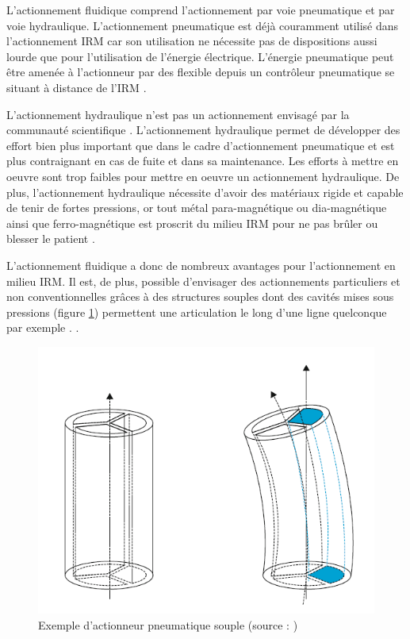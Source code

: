 \documentclass[10pt, a4paper]{article}
\begin{document}
            \qquad L'actionnement fluidique comprend l'actionnement par voie pneumatique et par voie hydraulique. L'actionnement pneumatique est déjà couramment utilisé dans l'actionnement IRM car son utilisation ne nécessite pas de dispositions aussi lourde que pour l'utilisation de l'énergie électrique. L'énergie pneumatique peut être amenée à l'actionneur par des flexible depuis un contrôleur pneumatique se situant à distance de l'IRM \cite{Fischer2008a}\cite{Pfeil2018}. 
            
             L'actionnement hydraulique n'est pas un actionnement envisagé par la communauté scientifique \cite{Fischer2008}. L'actionnement hydraulique permet de développer des effort bien plus important que dans le cadre d'actionnement pneumatique et est plus contraignant en cas de fuite et dans sa maintenance. Les efforts à mettre en oeuvre sont trop faibles \cite{Pfeil2018}\cite{Fischer2008a} pour mettre en oeuvre un actionnement hydraulique. De plus, l'actionnement hydraulique nécessite d'avoir des matériaux rigide et capable de tenir de fortes pressions, or tout métal para-magnétique ou dia-magnétique ainsi que ferro-magnétique est proscrit du milieu IRM pour ne pas brûler ou blesser le patient \cite{Sammet2016}.
             
 
             L'actionnement fluidique a donc de nombreux avantages pour l'actionnement en milieu IRM. Il est, de plus, possible d'envisager des actionnements particuliers et non conventionnelles grâces à des structures souples dont des cavités mises sous pressions (figure \ref{fig:ActSouple}) permettent une articulation le long d'une ligne quelconque par exemple . \cite{Lambert2016}\cite{Sedal2018}\cite{Lazarus2017}\cite{Sedal2018a}\cite{Polygerinos2015}\cite{Connolly2017}. 
             
\begin{figure}[ht!]
\centering
\includegraphics[scale=0.4]{ImageIntro/ExemplaActionnementSouple.PNG}
\caption{ Exemple d'actionneur pneumatique souple (source : \cite{Lambert2016})}
\label{fig:ActSouple}
\end{figure}
             
\end{document}
